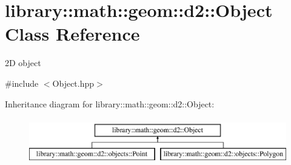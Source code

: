 \hypertarget{classlibrary_1_1math_1_1geom_1_1d2_1_1_object}{}\section{library\+:\+:math\+:\+:geom\+:\+:d2\+:\+:Object Class Reference}
\label{classlibrary_1_1math_1_1geom_1_1d2_1_1_object}


2D object  




{\ttfamily \#include $<$Object.\+hpp$>$}

Inheritance diagram for library\+:\+:math\+:\+:geom\+:\+:d2\+:\+:Object\+:\begin{figure}[H]
\begin{center}
\leavevmode
\includegraphics[height=2.000000cm]{classlibrary_1_1math_1_1geom_1_1d2_1_1_object}
\end{center}
\end{figure}

